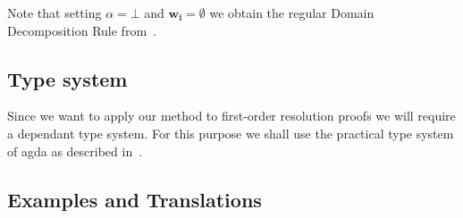 \documentclass[onehalfspacing]{article}
\begin{document}
Note that setting $\alpha=\bot$ and $\mathbf{w_i}=\emptyset$ we obtain the regular Domain Decomposition Rule from~\cite{Echenim_2019}.

\subsection{Type system}

Since we want to apply our method to first-order resolution proofs we will require a dependant type system. For this purpose we shall use the practical type system of agda as described in~\cite{agda}.

\subsection{Examples and Translations}
\end{document}
